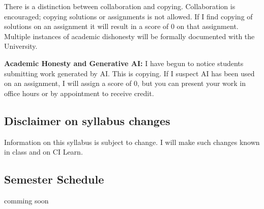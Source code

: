 \documentclass[
  letterpaper,
  DIV=11,
  numbers=noendperiod]{scrartcl}
\begin{document}
There is a distinction between collaboration and copying. Collaboration
is encouraged; copying solutions or assignments is not allowed. If I
find copying of solutions on an assignment it will result in a score of
0 on that assignment. Multiple instances of academic dishonesty will be
formally documented with the University.

\textbf{Academic Honesty and Generative AI:} I have begun to notice
students submitting work generated by AI. This is copying. If I suspect
AI has been used on an assignment, I will assign a score of 0, but you
can present your work in office hours or by appointment to receive
credit.

\subsection{Disclaimer on syllabus
changes}\label{disclaimer-on-syllabus-changes}

Information on this syllabus is subject to change. I will make such
changes known in class and on CI Learn.

\subsection{Semester Schedule}\label{semester-schedule}

comming soon
\end{document}
